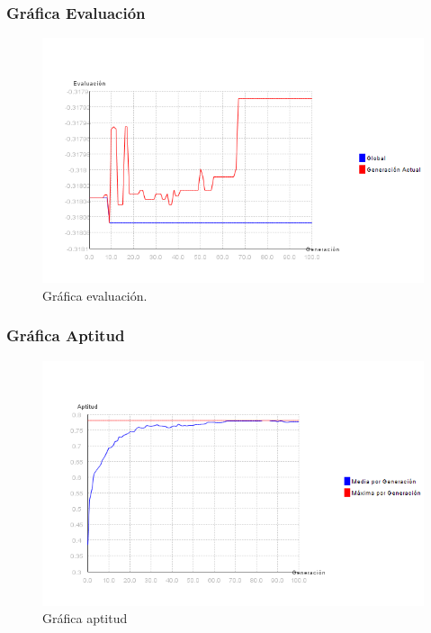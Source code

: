 \documentclass[12pt]{article}
\begin{document}
\subsubsection*{Gráfica Evaluación}
\begin{figure}[H]
\centering
\includegraphics[scale=0.5]{graficas/F3inicial_algoritmo}
\caption{Gráfica evaluación.}
\label{fig}
\end{figure}

\subsubsection*{Gráfica Aptitud}
\begin{figure}[H]
\centering
\includegraphics[scale=0.5]{graficas/F3inicial_aptitud}
\caption{Gráfica aptitud}
\label{fig}
\end{figure}
\end{document}
